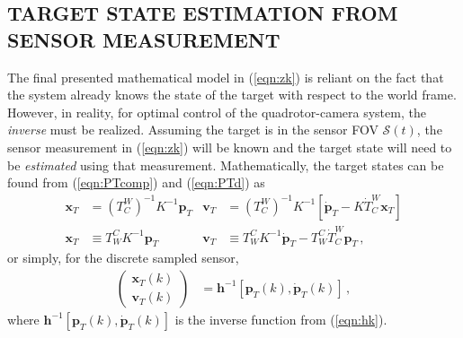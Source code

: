 \documentclass[11pt]{article}
\begin{document}
\subsection{TARGET STATE ESTIMATION FROM SENSOR MEASUREMENT}
The final presented mathematical model in (\ref{eqn:zk}) is reliant on the fact that the system already knows the state of the target with respect to the world frame. However, in reality, for optimal control of the quadrotor-camera system, the \textit{inverse} must be realized. Assuming the target is in the sensor FOV $\mathcal S(t)$, the sensor measurement in (\ref{eqn:zk}) will be known and the target state will need to be \textit{estimated} using that measurement. Mathematically, the target states can be found from (\ref{eqn:PTcomp}) and (\ref{eqn:PTd}) as
\begin{align}\label{eqn:inverse}
    \mathbf x_T&=(T_C^W)^{-1}K^{-1}\mathbf p_T & \mathbf v_T&=(T_C^W)^{-1}K^{-1}\left[\dot{\mathbf p}_T-K\dot T_C^W\mathbf x_T\right]\\
    \mathbf x_T&\equiv T_W^CK^{-1}\mathbf p_T & \mathbf v_T&\equiv T_W^CK^{-1}\dot{\mathbf p}_T-T_W^C\dot T_C^W\mathbf p_T\nonumber\,,
\end{align}
or simply, for the discrete sampled sensor,
\begin{align}
    \begin{pmatrix}
        \mathbf x_T(k)\\\mathbf v_T(k)
    \end{pmatrix}&=\mathbf h^{-1}[\mathbf p_T(k),\dot{\mathbf p}_T(k)]\,,
\end{align}
where $\mathbf h^{-1}[\mathbf p_T(k),\dot{\mathbf p}_T(k)]$ is the inverse function from (\ref{eqn:hk}).
\end{document}
